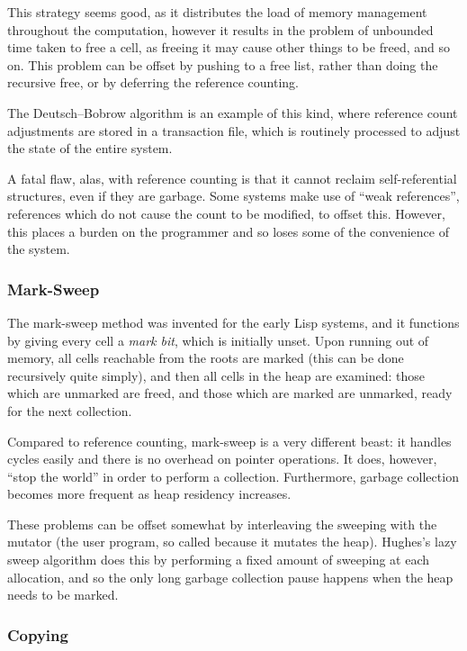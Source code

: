 This strategy seems good, as it distributes the load of memory
management throughout the computation, however it results in the
problem of unbounded time taken to free a \gls{cell}, as freeing it
may cause other things to be freed, and so on\cite{GarbageCollection}.
This problem can be offset by pushing to a \gls{free list}, rather
than doing the recursive free, or by deferring the reference counting.

The Deutsch--Bobrow algorithm is an example of this kind, where
reference count adjustments are stored in a transaction file, which is
routinely processed to adjust the state of the entire
system\cite{Deutsch76}.

A fatal flaw, alas, with reference counting is that it cannot reclaim
self-referential structures, even if they are
garbage\cite{McBeth63}. Some systems make use of ``\glspl{weak
  reference}'', references which do not cause the count to be
modified, to offset this. However, this places a burden on the
programmer and so loses some of the convenience of the system.

\subsubsection{Mark-Sweep}

The mark-sweep method was invented for the early Lisp
systems\cite{McCarthy60}, and it functions by giving every \gls{cell}
a \textit{mark bit}, which is initially unset. Upon running out of
memory, all cells reachable from the roots are marked (this can be
done recursively quite simply), and then all \glspl{cell} in the heap
are examined: those which are unmarked are freed, and those which are
marked are unmarked, ready for the next collection.

Compared to reference counting, mark-sweep is a very different beast:
it handles cycles easily and there is no overhead on pointer
operations. It does, however, ``\gls{stop the world}'' in order to
perform a collection\cite{GarbageCollection}. Furthermore, garbage
collection becomes more frequent as \gls{heap residency} increases.

These problems can be offset somewhat by interleaving the sweeping
with the \gls{mutator} (the user program, so called because it mutates
the heap). Hughes's lazy sweep algorithm\cite{Hughes82} does this by
performing a fixed amount of sweeping at each allocation, and so the
only long garbage collection pause happens when the heap needs to be
marked.

\subsubsection{Copying}

